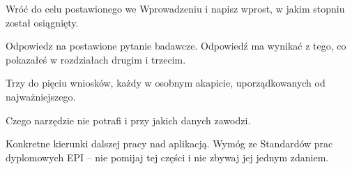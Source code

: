 \podsumowanie


 Wróć do celu postawionego we Wprowadzeniu i napisz wprost, w jakim stopniu został osiągnięty.

 Odpowiedz na postawione pytanie badawcze. Odpowiedź ma wynikać z tego, co pokazałeś w rozdziałach drugim i trzecim.

 Trzy do pięciu wniosków, każdy w osobnym akapicie, uporządkowanych od najważniejszego.

 Czego narzędzie nie potrafi i przy jakich danych zawodzi.

 Konkretne kierunki dalszej pracy nad aplikacją. Wymóg ze Standardów prac dyplomowych EPI – nie pomijaj tej części i nie zbywaj jej jednym zdaniem.
